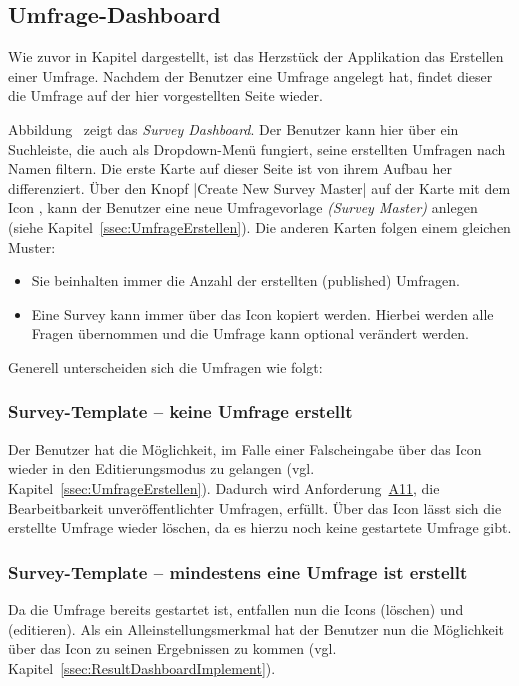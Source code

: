 \subsection{Umfrage-Dashboard}
\label{ssec:UmfrageDashboard}

Wie zuvor in Kapitel  dargestellt, ist das Herzstück der Applikation das Erstellen einer Umfrage.
Nachdem der Benutzer eine Umfrage  angelegt hat, findet dieser die Umfrage auf der hier vorgestellten Seite wieder.

Abbildung~ zeigt das \emph{Survey Dashboard}.
Der Benutzer kann hier über ein Suchleiste, die auch als Dropdown-Menü fungiert, seine erstellten Umfragen nach Namen filtern. \newline
Die erste Karte auf dieser Seite ist von ihrem Aufbau her differenziert.
Über den Knopf \jinline|Create New Survey Master| auf der Karte mit dem Icon \faPlusSquare, kann der Benutzer eine neue Umfragevorlage \emph{(Survey Master)} anlegen (siehe Kapitel~\vref{ssec:UmfrageErstellen}). \newline
Die anderen Karten folgen einem gleichen Muster:
% 
\begin{itemize}
	\item Sie beinhalten immer die Anzahl der erstellten (published) Umfragen.
	\item Eine Survey kann immer über das Icon \faCopy\xspace kopiert werden.
	Hierbei werden alle Fragen übernommen und die Umfrage kann optional verändert werden.
\end{itemize}
%
Generell unterscheiden sich die Umfragen wie folgt:
% 
\subsubsection*{Survey-Template -- keine Umfrage erstellt}
%
Der Benutzer hat die Möglichkeit, im Falle einer Falscheingabe über das Icon \faEdit\xspace wieder in den Editierungsmodus zu gelangen (vgl. Kapitel~\vref{ssec:UmfrageErstellen}).
Dadurch wird Anforderung~\hyperref[Anf:A11]{A11}, die Bearbeitbarkeit unveröffentlichter Umfragen, erfüllt.
Über das Icon \faTrash\xspace lässt sich die erstellte Umfrage wieder löschen, da es hierzu noch keine gestartete Umfrage gibt.

\subsubsection*{Survey-Template -- mindestens eine Umfrage ist erstellt}
%
Da die Umfrage bereits gestartet ist, entfallen nun die Icons \faTrash\xspace (löschen) und \faEdit\xspace (editieren).
Als ein Alleinstellungsmerkmal hat der Benutzer nun die Möglichkeit über das Icon \faIdCard\xspace zu seinen Ergebnissen zu kommen (vgl. Kapitel~\vref{ssec:ResultDashboardImplement}).

